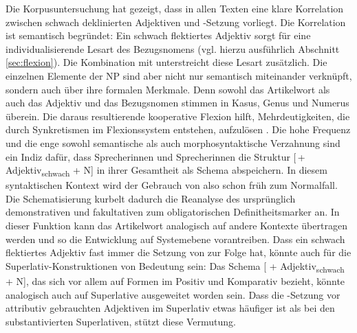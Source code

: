 Die Korpusuntersuchung hat gezeigt, dass in allen Texten eine klare Korrelation zwischen schwach deklinierten Adjektiven und -Setzung vorliegt. Die Korrelation ist semantisch begründet: Ein schwach flektiertes Adjektiv sorgt für eine individualisierende Lesart des Bezugsnomens (vgl. hierzu ausführlich Abschnitt \ref{sec:flexion}). Die Kombination mit  unterstreicht diese Lesart zusätzlich.  Die einzelnen Elemente der NP sind aber nicht nur semantisch miteinander verknüpft, sondern auch über ihre formalen Merkmale. Denn sowohl das Artikelwort als auch das Adjektiv und das Bezugsnomen stimmen in Kasus, Genus und Numerus überein. Die daraus resultierende kooperative Flexion hilft, Mehrdeutigkeiten, die durch Synkretismen im Flexionssystem entstehen, aufzulösen \parencite[127]{Szczepaniak2010}. Die hohe Frequenz und die enge sowohl semantische als auch morphosyntaktische Verzahnung sind ein Indiz dafür, dass Sprecherinnen und Sprecherinnen die Struktur [\,+\,Adjektiv\textsubscript{schwach} + N] in ihrer Gesamtheit als Schema abspeichern. In diesem syntaktischen Kontext wird der Gebrauch von  also schon früh zum Normalfall. Die Schematisierung kurbelt dadurch die Reanalyse des ursprünglich demonstrativen und fakultativen  zum obligatorischen Definitheitsmarker an. In dieser Funktion kann das Artikelwort analogisch auf andere Kontexte übertragen werden und so die Entwicklung auf Systemebene vorantreiben. Dass ein schwach flektiertes Adjektiv fast immer die Setzung von  zur Folge hat, könnte auch für die Superlativ-Konstruktionen von Bedeutung sein: Das Schema [ + Adjektiv\textsubscript{schwach} + N], das sich vor allem auf Formen im Positiv und Komparativ bezieht, könnte analogisch auch auf Superlative ausgeweitet worden sein. Dass die -Setzung vor attributiv gebrauchten Adjektiven im Superlativ etwas häufiger ist als bei den substantivierten Superlativen,  stützt diese Vermutung. 

